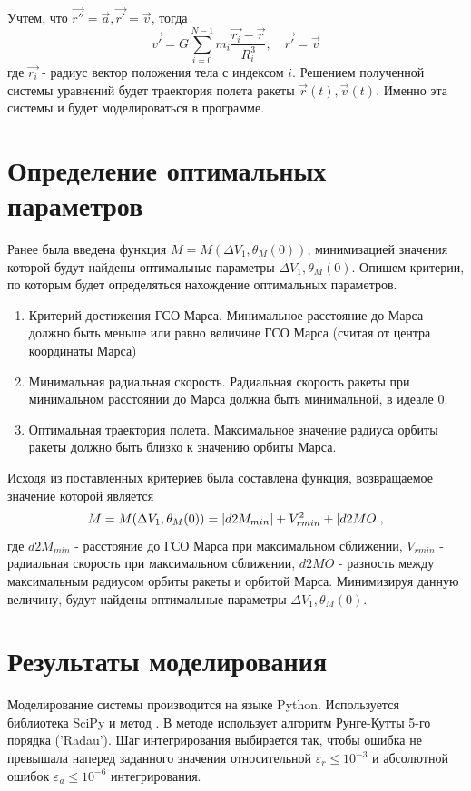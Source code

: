 Учтем, что $\vec{r''}=\vec{a}, \vec{r'} = \vec{v}$, тогда
\begin{equation}
	\vec{v'} = G \sum_{i=0}^{N-1}m_i\frac{\vec{r_i}-\vec{r}}{R_i^3}, \quad
	\vec{r'} = \vec{v}
\end{equation}
где $\vec{r_i}$ - радиус вектор положения тела с индексом $i$.
Решением полученной системы уравнений будет траектория полета ракеты $\vec{r}(t), \vec{v}(t)$.
Именно эта системы и будет моделироваться в программе.

\section{Определение оптимальных параметров}
Ранее была введена функция $M=M(\Delta V_1, \theta_M(0))$, минимизацией значения которой будут найдены оптимальные 
параметры $\Delta V_1, \theta_M(0)$. Опишем критерии, по которым будет определяться нахождение оптимальных параметров.
\begin{enumerate}
	\item Критерий достижения ГСО Марса. Минимальное расстояние до Марса должно быть меньше или равно величине
	ГСО Марса (считая от центра координаты Марса)
	\item Минимальная радиальная скорость. Радиальная скорость ракеты при минимальном расстоянии до Марса должна быть минимальной, в идеале 0.
	\item Оптимальная траектория полета. Максимальное значение радиуса орбиты ракеты должно быть близко к значению орбиты Марса.
\end{enumerate}
Исходя из поставленных критериев была составлена функция, возвращаемое значение которой является
\begin{equation}
	M=M(\Delta V_1, \theta_M(0)) = \abs{d2M_{min}} + V_{r min}^2 + \abs{d2MO},
\end{equation}
где $d2M_{min}$ - расстояние до ГСО Марса при максимальном сближении, $V_{r min}$ - радиальная скорость при максимальном сближении,
$d2MO$ - разность между максимальным радиусом орбиты ракеты и орбитой Марса.
Минимизируя данную величину, будут найдены оптимальные параметры $\Delta V_1, \theta_M(0)$.

\section{Результаты моделирования}
Моделирование системы производится на языке Python.
Используется библиотека SciPy и метод .
В методе  использует алгоритм Рунге-Кутты 5-го порядка ('Radau'). Шаг интегрирования выбирается так,
чтобы ошибка не превышала наперед заданного значения относительной $\varepsilon_r \leq 10^{-3}$ и абсолютной
ошибок $\varepsilon_a \leq 10^{-6}$ интегрирования.

